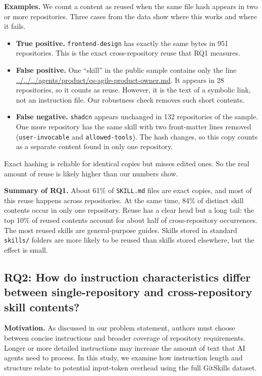 \documentclass[sigconf,review]{acmart}
\begin{document}
\textbf{Examples.}
We count a content as reused when the same file hash appears in two or more repositories.
Three cases from the data show where this works and where it fails.
\begin{itemize}
\item \textbf{True positive.} \texttt{frontend-design} has exactly the same bytes in 951 repositories.
This is the exact cross-repository reuse that RQ1 measures.
\item \textbf{False positive.} One ``skill'' in the public sample contains only the line \url{../../../agents/product/cs-agile-product-owner.md}.
It appears in 28 repositories, so it counts as reuse.
However, it is the text of a symbolic link, not an instruction file.
Our robustness check removes such short contents.
\item \textbf{False negative.} \texttt{shadcn} appears unchanged in 132 repositories of the sample.
One more repository has the same skill with two front-matter lines removed (\texttt{user-invocable} and \texttt{allowed-tools}).
The hash changes, so this copy counts as a separate content found in only one repository.
\end{itemize}
Exact hashing is reliable for identical copies but misses edited ones.
So the real amount of reuse is likely higher than our numbers show.

\textbf{Summary of RQ1.}
About 61\% of \texttt{SKILL.md} files are exact copies, and most of this reuse happens across repositories.
At the same time, 84\% of distinct skill contents occur in only one repository.
Reuse has a clear head but a long tail: the top 10\% of reused contents account for about half of cross-repository occurrences.
The most reused skills are general-purpose guides.
Skills stored in standard \texttt{skills/} folders are more likely to be reused than skills stored elsewhere, but the effect is small.
\subsection{RQ2: How do instruction characteristics differ
between single-repository and cross-repository skill contents?}

\textbf{Motivation.}
As discussed in our problem statement, authors must choose
between concise instructions and broader coverage of repository
requirements. Longer or more detailed instructions may increase
the amount of text that AI agents need to process. In this study,
we examine how instruction length and structure relate to
potential input-token overhead using the full GitSkills dataset.
\end{document}
